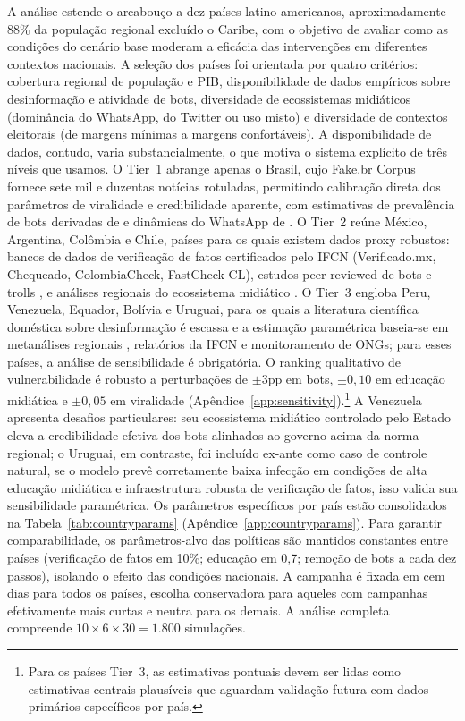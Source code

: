 \documentclass[12pt,a4paper]{article}
\theoremstyle{definition}
\theoremstyle{plain}
\begin{document}
A análise estende o arcabouço a dez países latino-americanos, aproximadamente 88\% da população regional excluído o Caribe, com o objetivo de avaliar como as condições do cenário base moderam a eficácia das intervenções em diferentes contextos nacionais. A seleção dos países foi orientada por quatro critérios: cobertura regional de população e PIB, disponibilidade de dados empíricos sobre desinformação e atividade de bots, diversidade de ecossistemas midiáticos (dominância do WhatsApp, do Twitter ou uso misto) e diversidade de contextos eleitorais (de margens mínimas a margens confortáveis). A disponibilidade de dados, contudo, varia substancialmente, o que motiva o sistema explícito de três níveis que usamos. O Tier~1 abrange apenas o Brasil, cujo Fake.br Corpus \citep{monteiro2018fakebr} fornece sete mil e duzentas notícias rotuladas, permitindo calibração direta dos parâmetros de viralidade e credibilidade aparente, com estimativas de prevalência de bots derivadas de \citet{ruediger2018bots} e dinâmicas do WhatsApp de \citet{machado2019whatsapp}. O Tier~2 reúne México, Argentina, Colômbia e Chile, países para os quais existem dados proxy robustos: bancos de dados de verificação de fatos certificados pelo IFCN (Verificado.mx, Chequeado, ColombiaCheck, FastCheck CL), estudos peer-reviewed de bots e trolls \citep{calvo2020fake, signalab2018}, e análises regionais do ecossistema midiático \citep{trere2020hybrid, salaverria2020}. O Tier~3 engloba Peru, Venezuela, Equador, Bolívia e Uruguai, para os quais a literatura científica doméstica sobre desinformação é escassa e a estimação paramétrica baseia-se em metanálises regionais \citep{bradshaw2019global, lupu2020socialmedia, waisbord2018post}, relatórios da IFCN e monitoramento de ONGs; para esses países, a análise de sensibilidade é obrigatória. O ranking qualitativo de vulnerabilidade é robusto a perturbações de $\pm 3$pp em bots, $\pm 0{,}10$ em educação midiática e $\pm 0{,}05$ em viralidade (Apêndice~\ref{app:sensitivity}).\footnote{Para os países Tier~3, as estimativas pontuais devem ser lidas como estimativas centrais plausíveis que aguardam validação futura com dados primários específicos por país.} A Venezuela apresenta desafios particulares: seu ecossistema midiático controlado pelo Estado eleva a credibilidade efetiva dos bots alinhados ao governo acima da norma regional; o Uruguai, em contraste, foi incluído ex-ante como caso de controle natural, se o modelo prevê corretamente baixa infecção em condições de alta educação midiática e infraestrutura robusta de verificação de fatos, isso valida sua sensibilidade paramétrica. Os parâmetros específicos por país estão consolidados na Tabela~\ref{tab:countryparams} (Apêndice~\ref{app:countryparams}). Para garantir comparabilidade, os parâmetros-alvo das políticas são mantidos constantes entre países (verificação de fatos em 10\%; educação em 0,7; remoção de bots a cada dez passos), isolando o efeito das condições nacionais. A campanha é fixada em cem dias para todos os países, escolha conservadora para aqueles com campanhas efetivamente mais curtas e neutra para os demais. A análise completa compreende $10 \times 6 \times 30 = 1{.}800$ simulações.
\end{document}
